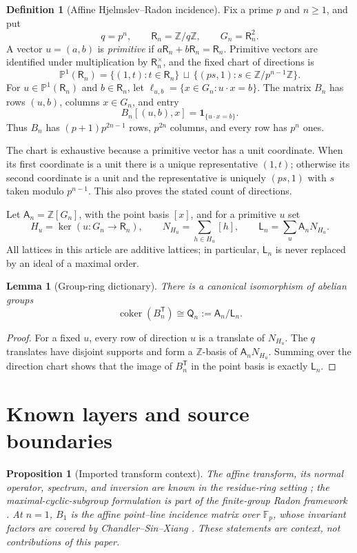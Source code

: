 \documentclass[12pt,a4paper]{article}
\newtheorem{lemma}[theorem]{Lemma}
\newtheorem{proposition}[theorem]{Proposition}
\theoremstyle{definition}
\newtheorem{definition}[theorem]{Definition}
\newcommand{\Z}{\mathbb Z}
\newcommand{\F}{\mathbb F}
\newcommand{\R}{\mathsf R}
\newcommand{\A}{\mathsf A}
\newcommand{\LL}{\mathsf L}
\newcommand{\QQ}{\mathsf Q}
\newcommand{\coker}{\operatorname{coker}}
\newcommand{\transpose}{\mathsf T}
\begin{document}
\begin{definition}[Affine Hjelmslev--Radon incidence]
\label{def:affine-incidence}
Fix a prime $p$ and $n\geq1$, and put
\[
 q=p^n,\qquad \R_n=\Z/q\Z,\qquad G_n=\R_n^2.
\]
A vector $u=(a,b)$ is \emph{primitive} if $a\R_n+b\R_n=\R_n$.
Primitive vectors are identified under multiplication by $\R_n^\times$,
and the fixed chart of directions is
\[
 \mathbb P^1(\R_n)=
 \{(1,t):t\in\R_n\}\,\sqcup\,
 \{(ps,1):s\in\Z/p^{n-1}\Z\}.
\]
For $u\in\mathbb P^1(\R_n)$ and $b\in\R_n$, let
\(
 \ell_{u,b}=\{x\in G_n:u\cdot x=b\}.
\)
The matrix $B_n$ has rows $(u,b)$, columns $x\in G_n$, and entry
\[
 B_n[(u,b),x]=\mathbf1_{\{u\cdot x=b\}}.
\]
Thus $B_n$ has $(p+1)p^{2n-1}$ rows, $p^{2n}$ columns, and every row has
$p^n$ ones.
\end{definition}

The chart is exhaustive because a primitive vector has a unit coordinate.
When its first coordinate is a unit there is a unique representative
$(1,t)$; otherwise its second coordinate is a unit and the representative
is uniquely $(ps,1)$ with $s$ taken modulo $p^{n-1}$.  This also proves the
stated count of directions.

Let $\A_n=\Z[G_n]$, with the point basis $[x]$, and for a primitive $u$ set
\[
 H_u=\ker(u:G_n\longrightarrow\R_n),\qquad
 N_{H_u}=\sum_{h\in H_u}[h],\qquad
 \LL_n=\sum_u\A_nN_{H_u}.
\]
All lattices in this article are additive lattices; in particular, $\LL_n$
is never replaced by an ideal of a maximal order.

\begin{lemma}[Group-ring dictionary]
\label{lem:group-ring-dictionary}
There is a canonical isomorphism of abelian groups
\[
 \coker(B_n^{\transpose})\cong \QQ_n:=\A_n/\LL_n.
\]
\end{lemma}

\begin{proof}
For a fixed $u$, every row of direction $u$ is a translate of $N_{H_u}$.
The $q$ translates have disjoint supports and form a $\Z$-basis of
$\A_nN_{H_u}$.  Summing over the direction chart shows that the image of
$B_n^{\transpose}$ in the point basis is exactly $\LL_n$.
\end{proof}

\section{Known layers and source boundaries}\label{sec:S02}

\begin{proposition}[Imported transform context]
\label{prop:transform-context}
The affine transform, its normal operator, spectrum, and inversion are known
in the residue-ring setting \cite[Theorems~5.1, 5.3, 5.4]{MOL12}; the
maximal-cyclic-subgroup formulation is part of the finite-group Radon
framework \cite[Section~7.3]{ILM}.  At $n=1$, $B_1$ is the affine
point--line incidence matrix over $\F_p$, whose invariant factors are
covered by Chandler--Sin--Xiang \cite{CSX06}.  These statements are context,
not contributions of this paper.
\end{proposition}
\end{document}
